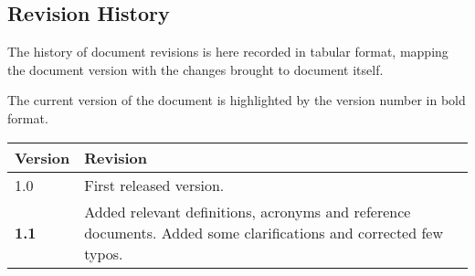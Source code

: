 \subsection{Revision History}

The history of document revisions is here recorded in tabular format, mapping the document version with the changes brought to document itself.

The current version of the document is highlighted by the version number in bold format.

\begin{longtable}{ |l|p{7cm}| }
        \hline
        \textbf{Version} & \textbf{Revision}\\ \hline
        1.0 & First released version.\\ \hline
	\textbf{1.1} & Added relevant definitions, acronyms and reference documents. Added some clarifications and corrected few typos. \\
	\hline
\end{longtable}
~               
